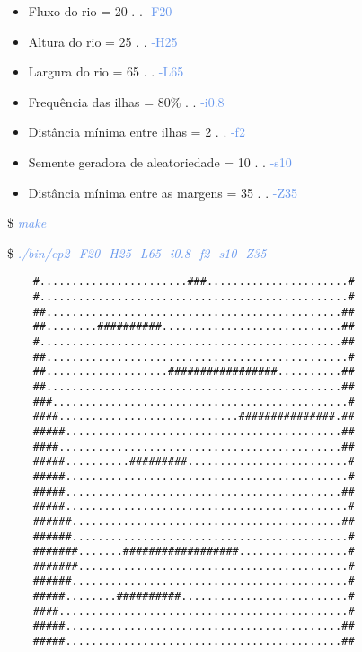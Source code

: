 \documentclass[a4paper,12pt]{article}
\begin{document}
    \begin{itemize}
    \bigskip
    
    \item Fluxo do rio = 20  . . \textcolor{CornflowerBlue}{-F20}  
    \item Altura do rio = 25  . . \textcolor{CornflowerBlue}{-H25}
    \item Largura do rio = 65  . . \textcolor{CornflowerBlue}{-L65}
    \item Frequência das ilhas = 80\%  . . \textcolor{CornflowerBlue}{-i0.8}
    \item Distância mínima entre ilhas = 2  . . \textcolor{CornflowerBlue}{-f2}
    \item Semente geradora de aleatoriedade = 10  . . \textcolor{CornflowerBlue}{-s10}
    \item Distância mínima entre as margens = 35  . . \textcolor{CornflowerBlue}{-Z35}
    
    \end{itemize}  
    \bigskip
    
    \$ \textcolor{CornflowerBlue}{\textit{make}}
    
    \$ \textcolor{CornflowerBlue}{\textit{./bin/ep2 -F20 -H25 -L65 -i0.8 -f2 -s10 -Z35}}
    
    \bigskip
    \begin{verbatim}
    #.......................###......................#
    #................................................#
    ##..............................................##
    ##........##########............................##
    #...............................................##
    ##...............................................#
    ##...................#################..........##
    ##..............................................##
    ###..............................................#
    ####............................###############.##
    #####...........................................##
    ####............................................##
    #####..........#########.........................#
    #####............................................#
    #####...........................................##
    #####............................................#
    ######..........................................##
    ######...........................................#
    #######.......##################.................#
    #######..........................................#
    ######...........................................#
    #####........##########..........................#
    ####.............................................#
    #####...........................................##
    #####...........................................##
    \end{verbatim}
\end{document}

